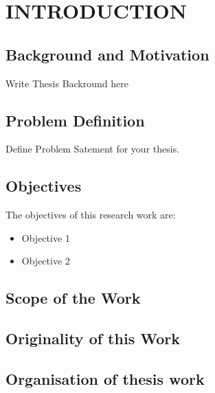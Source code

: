 \chapter{INTRODUCTION}
\section{Background and Motivation}
Write Thesis Backround here

\section{Problem Definition}
Define Problem Satement for your thesis.
\newpage
\section{Objectives}
The objectives of this research work are: 
\begin{itemize}
  \item Objective 1
  \item Objective 2
\end{itemize}

\section{Scope of the Work}
\section{Originality of this Work}
\section{Organisation of thesis work}
